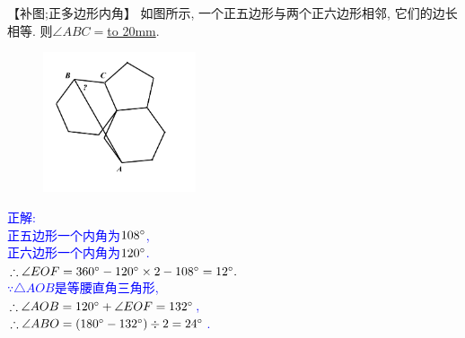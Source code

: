 \item {
    【补图;正多边形内角】
    如图所示, 一个正五边形与两个正六边形相邻, 它们的边长相等. 则$\angle ABC = $\underline{\hbox to 20mm{}}.
    \begin{figure}[H] 
        \centering
        \includegraphics[width=0.4\textwidth]{./pics/Chapter_2/7.png}
    \end{figure}
    \ifshowSolution 
        \fangsong{}\textcolor{blue}{
            正解: \\
            正五边形一个内角为$108\degree$, \\
            正六边形一个内角为$120\degree$. \\
            $\therefore \angle EOF = 360\degree - 120\degree \times 2 - 108\degree = 12\degree.$ \\
            $\because \triangle AOB 是等腰直角三角形$, \\
            $\therefore \angle AOB = 120\degree + \angle EOF = 132\degree$,\\
            $\therefore \angle ABO = (180\degree - 132\degree) \div 2 = 24\degree$.\\
        }
    \else
        \vspace{1cm}
    \fi
}

